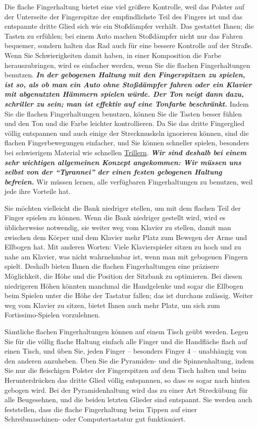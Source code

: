 Die flache Fingerhaltung bietet eine viel größere Kontrolle, weil das Polster auf der Unterseite der Fingerspitze der empfindlichste Teil des Fingers ist und das entspannte dritte Glied sich wie ein Stoßdämpfer verhält.
Das gestattet Ihnen; die Tasten zu erfühlen; bei einem Auto machen Stoßdämpfer nicht nur das Fahren bequemer, sondern halten das Rad auch für eine bessere Kontrolle auf der Straße.
Wenn Sie Schwierigkeiten damit haben, in einer Komposition die Farbe herauszubringen, wird es einfacher werden, wenn Sie die flachen Fingerhaltungen benutzen.
\textbf{\textit{In der gebogenen Haltung mit den Fingerspitzen zu spielen, ist so, als ob man ein Auto ohne Stoßdämpfer fahren oder ein Klavier mit abgenutzten Hämmern spielen würde.
Der Ton neigt dann dazu, schriller zu sein; man ist effektiv auf eine Tonfarbe beschränkt.}}
Indem Sie die flachen Fingerhaltungen benutzen, können Sie die Tasten besser fühlen und den Ton und die Farbe leichter kontrollieren.
Da Sie das dritte Fingerglied völlig entspannen und auch einige der Streckmuskeln ignorieren können, sind die flachen Fingerbewegungen einfacher, und Sie können schneller spielen, besonders bei schwierigem Material wie schnellen \hyperref[c1iii3]{Trillern}.
\textbf{\textit{Wir sind deshalb bei einem sehr wichtigen allgemeinen Konzept angekommen: Wir müssen uns selbst von der \enquote{Tyrannei} der einen festen gebogenen Haltung befreien.}}
Wir müssen lernen, alle verfügbaren Fingerhaltungen zu benutzen, weil jede ihre Vorteile hat.

Sie möchten vielleicht die Bank niedriger stellen, um mit dem flachen Teil der Finger spielen zu können.
Wenn die Bank niedriger gestellt wird, wird es üblicherweise notwendig, sie weiter weg vom Klavier zu stellen, damit man zwischen dem Körper und dem Klavier mehr Platz zum Bewegen der Arme und Ellbogen hat.
Mit anderen Worten: Viele Klavierspieler sitzen zu hoch und zu nahe am Klavier, was nicht wahrnehmbar ist, wenn man mit gebogenen Fingern spielt.
Deshalb bieten Ihnen die flachen Fingerhaltungen eine präzisere Möglichkeit, die Höhe und die Position der Sitzbank zu optimieren.
Bei diesen niedrigeren Höhen könnten manchmal die Handgelenke und sogar die Ellbogen beim Spielen unter die Höhe der Tastatur fallen; das ist durchaus zulässig.
Weiter weg vom Klavier zu sitzen, bietet Ihnen auch mehr Platz, um sich zum Fortissimo-Spielen vorzulehnen.

Sämtliche flachen Fingerhaltungen können auf einem Tisch geübt werden.
Legen Sie für die völlig flache Haltung einfach alle Finger und die Handfläche flach auf einen Tisch, und üben Sie, jeden Finger -- besonders Finger 4 -- unabhängig von den anderen anzuheben.
Üben Sie die Pyramiden- und die Spinnenhaltung, indem Sie nur die fleischigen Polster der Fingerspitzen auf dem Tisch halten und beim Herunterdrücken das dritte Glied völlig entspannen, so dass es sogar nach hinten gebogen wird.
Bei der Pyramidenhaltung wird das zu einer Art Streckübung für alle Beugesehnen, und die beiden letzten Glieder sind entspannt.
Sie werden auch feststellen, dass die flache Fingerhaltung beim Tippen auf einer Schreibmaschinen- oder Computertastatur gut funktioniert.


